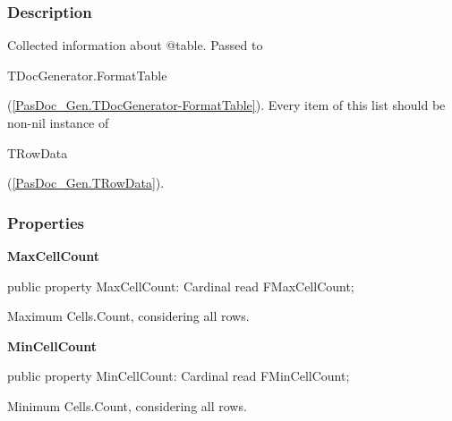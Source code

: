 \documentclass{report}
\newif\ifpdf
\begin{document}
\subsubsection*{\large{\textbf{Description}}\normalsize\hspace{1ex}\hfill}
Collected information about @table. Passed to \begin{ttfamily}TDocGenerator.FormatTable\end{ttfamily}(\ref{PasDoc_Gen.TDocGenerator-FormatTable}). Every item of this list should be non{-}nil instance of \begin{ttfamily}TRowData\end{ttfamily}(\ref{PasDoc_Gen.TRowData}).\subsubsection*{\large{\textbf{Properties}}\normalsize\hspace{1ex}\hfill}
\begin{list}{}{
\setlength{\itemindent}{0cm}
\setlength{\listparindent}{0cm}
\setlength{\leftmargin}{\evensidemargin}
\addtolength{\leftmargin}{\tmplength}
\settowidth{\labelsep}{X}
\addtolength{\leftmargin}{\labelsep}
\setlength{\labelwidth}{\tmplength}
}
\label{PasDoc_Gen.TTableData-MaxCellCount}
\item[\textbf{MaxCellCount}\hfill]
\ifpdf
\begin{flushleft}
\fi
\begin{ttfamily}
public property MaxCellCount: Cardinal read FMaxCellCount;\end{ttfamily}

\ifpdf
\end{flushleft}
\fi


\par Maximum Cells.Count, considering all rows.\label{PasDoc_Gen.TTableData-MinCellCount}
\item[\textbf{MinCellCount}\hfill]
\ifpdf
\begin{flushleft}
\fi
\begin{ttfamily}
public property MinCellCount: Cardinal read FMinCellCount;\end{ttfamily}

\ifpdf
\end{flushleft}
\fi


\par Minimum Cells.Count, considering all rows.\end{list}
\ifpdf
\end{document}
